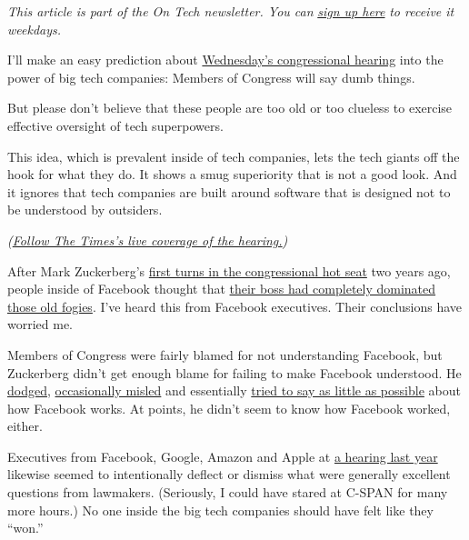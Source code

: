 \emph{This article is part of the On Tech newsletter. You can}
\href{https://www.nytimes.com/newsletters/signup/OT}{\emph{sign up
here}} \emph{to receive it weekdays.}

I'll make an easy prediction about
\href{https://www.nytimes.com/2020/07/28/technology/amazon-apple-facebook-google-antitrust-hearing.html}{Wednesday's
congressional hearing} into the power of big tech companies: Members of
Congress will say dumb things.

But please don't believe that these people are too old or too clueless
to exercise effective oversight of tech superpowers.

This idea, which is prevalent inside of tech companies, lets the tech
giants off the hook for what they do. It shows a smug superiority that
is not a good look. And it ignores that tech companies are built around
software that is designed not to be understood by outsiders.

\emph{(}\href{https://www.nytimes.com/live/2020/07/29/technology/tech-ceos-hearing-testimony}{\emph{Follow
The Times's live coverage of the hearing.}}\emph{)}

After Mark Zuckerberg's
\href{https://www.nytimes.com/2018/04/12/technology/mark-zuckerberg-testimony.html}{first
turns in the congressional hot seat} two years ago, people inside of
Facebook thought that
\href{https://www.wired.com/story/sigh-of-relief-inside-facebook/}{their
boss had completely dominated those old fogies}. I've heard this from
Facebook executives. Their conclusions have worried me.

Members of Congress were fairly blamed for not understanding Facebook,
but Zuckerberg didn't get enough blame for failing to make Facebook
understood. He
\href{https://www.nytimes.com/2018/04/10/technology/zuckerberg-elections-russia-data-privacy.html}{dodged},
\href{https://www.washingtonpost.com/news/fact-checker/wp/2018/04/13/fact-checking-mark-zuckerbergs-testimony-on-facebook-and-data-collection/}{occasionally
misled} and essentially
\href{https://www.bloomberg.com/opinion/articles/2018-04-12/mark-zuckerberg-refuses-to-admit-how-facebook-works}{tried
to say as little as possible} about how Facebook works. At points, he
didn't seem to know how Facebook worked, either.

Executives from Facebook, Google, Amazon and Apple at
\href{https://www.nytimes.com/2019/07/16/technology/big-tech-antitrust-hearing.html}{a
hearing last year} likewise seemed to intentionally deflect or dismiss
what were generally excellent questions from lawmakers. (Seriously, I
could have stared at C-SPAN for many more hours.) No one inside the big
tech companies should have felt like they ``won.''


